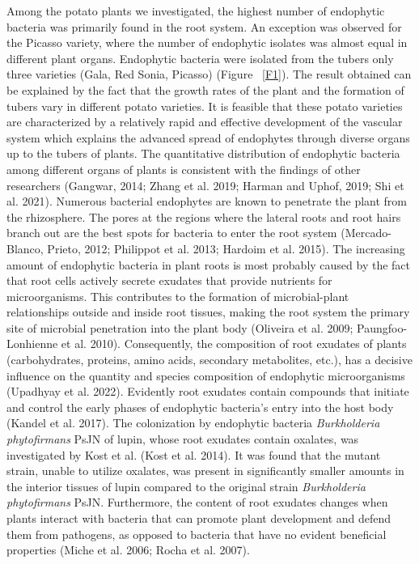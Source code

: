 \documentclass[sn-mathphys,Numbered]{sn-jnl}%
\theoremstyle{thmstyleone}%
\theoremstyle{thmstyletwo}%
\theoremstyle{thmstylethree}%
\begin{document}
Among the potato plants we investigated, the highest number of endophytic bacteria was primarily found in the root system. An exception was observed for the Picasso variety, where the number of endophytic isolates was almost equal in different plant organs. Endophytic bacteria were isolated from the tubers only three varieties (Gala, Red Sonia, Picasso) (Figure  ~\ref{F1}). The result obtained can be explained by the fact that the growth rates of the plant and the formation of tubers vary in different potato varieties. It is feasible that these potato varieties are characterized by a relatively rapid and effective development of the vascular system which explains the advanced spread of endophytes through diverse organs up to the tubers of plants.
The quantitative distribution of endophytic bacteria among different organs of plants is consistent with the findings of other researchers (Gangwar, 2014; Zhang et al. 2019; Harman and Uphof, 2019; Shi et al. 2021). 
Numerous bacterial endophytes are known to penetrate the plant from the rhizosphere. The pores at the regions where the lateral roots and root hairs branch out are the best spots for bacteria to enter the root system (Mercado-Blanco, Prieto, 2012; Philippot et al. 2013; Hardoim et al. 2015). The increasing amount of endophytic bacteria in plant roots is most probably caused by the fact that root cells actively secrete exudates that provide nutrients for microorganisms. This contributes to the formation of microbial-plant relationships outside and inside root tissues, making the root system the primary site of microbial penetration into the plant body (Oliveira et al. 2009; Paungfoo-Lonhienne et al. 2010). Consequently, the composition of root exudates of plants (carbohydrates, proteins, amino acids, secondary metabolites, etc.), has a decisive influence on the quantity and species composition of endophytic microorganisms (Upadhyay et al. 2022). Evidently root exudates contain compounds that initiate and control the early phases of endophytic bacteria's entry into the host body (Kandel et al. 2017). The colonization by endophytic bacteria\textit{ Burkholderia phytofirmans} PsJN of lupin, whose root exudates contain oxalates, was investigated by Kost et al. (Kost et al. 2014). It was found that the mutant strain, unable to utilize oxalates, was present in significantly smaller amounts in the interior tissues of lupin compared to the original strain \textit{Burkholderia phytofirmans} PsJN. Furthermore, the content of root exudates changes when plants interact with bacteria that can promote plant development and defend them from pathogens, as opposed to bacteria that have no evident beneficial properties (Miche et al. 2006; Rocha et al. 2007).
\end{document}

